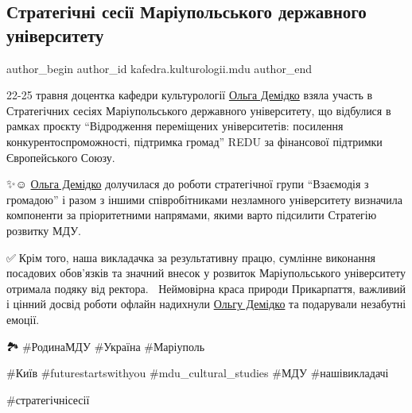  
 
 
 
 

\subsection{Стратегічні сесії Маріупольського державного університету}
\label{sec:26_05_2023.fb.kafedra.kulturologii.mdu.1.strategic_sessions_mariupol_university}
 
\ifcmt
 author_begin
   author_id kafedra.kulturologii.mdu
 author_end
\fi


22-25 травня доцентка кафедри культурології \href{\urlDemidkoIA}{Ольга Демідко} взяла участь в
Стратегічних сесіях Маріупольського державного університету, що відбулися в
рамках проєкту \enquote{Відродження переміщених університетів: посилення
конкурентоспроможності, підтримка громад} REDU за фінансової підтримки
Європейського Союзу.

✨️☺️ \href{\urlDemidkoIA}{Ольга Демідко} долучилася до роботи стратегічної групи
\enquote{Взаємодія з громадою} і разом з іншими співробітниками незламного університету
визначила компоненти за пріоритетними напрямами, якими варто підсилити
Стратегію розвитку МДУ.

✅️👏Крім того, наша викладачка  за результативну працю,
сумлінне виконання посадових обов'язків та значний внесок у розвиток
Маріупольського університету  отримала подяку від ректора. 🥰🎉Неймовірна краса
природи Прикарпаття, важливий і цінний досвід роботи офлайн надихнули \href{\urlDemidkoIA}{Ольгу
Демідко} та подарували незабутні емоції. 

🏞💛\#РодинаМДУ  \#Україна \#Маріуполь

\#Київ  \#futurestartswithyou  \#mdu\_cultural\_studies \#МДУ  \#нашівикладачі

\#стратегічнісесії
